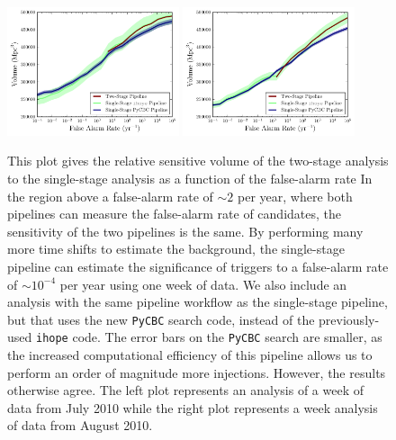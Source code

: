 \documentclass[12pt]{iopart} \usepackage{graphicx,amssymb}
\begin{document}
\begin{figure}[tbp]
\begin{center}
\includegraphics[width=0.45\textwidth]{figures/volume_plots/two_and_single_stage_w1_volume.pdf}
\includegraphics[width=0.45\textwidth]{figures/volume_plots/two_and_single_stage_w2_volume.pdf}
\caption{This plot gives the relative sensitive volume of the two-stage
analysis to the single-stage analysis as a function of the false-alarm rate
In the region above a false-alarm rate of
$\sim 2$ per year, where both pipelines can measure the false-alarm rate of
candidates, the sensitivity of the two pipelines is the same. By performing
many more time shifts to estimate the background, the single-stage pipeline
can estimate the significance of triggers to a false-alarm rate of $\sim
10^{-4}$ per year using one week of data. We also include an analysis with the
same pipeline workflow as the single-stage pipeline, but that uses the new
\texttt{PyCBC} search code, instead of the previously-used \texttt{ihope}
code. The error bars on the \texttt{PyCBC} search are smaller, as the increased
computational efficiency of this pipeline allows us to perform an order of
magnitude more injections. However, the results otherwise agree. The left plot
represents an analysis of a week of data from July 2010 while the right plot represents a week
analysis of data from August 2010.}
\label{fig:roc1}
\end{center}
\end{figure}
\end{document}
